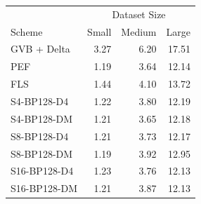 \begin{tabular}{lrrr}
\toprule
 & \multicolumn{3}{c}{Dataset Size} \\
Scheme & Small & Medium & Large \\
\midrule
GVB + Delta & 3.27 & 6.20 & 17.51 \\
PEF & 1.19 & 3.64 & 12.14 \\
FLS & 1.44 & 4.10 & 13.72 \\
S4-BP128-D4 & 1.22 & 3.80 & 12.19 \\
S4-BP128-DM & 1.21 & 3.65 & 12.18 \\
S8-BP128-D4 & 1.21 & 3.73 & 12.17 \\
S8-BP128-DM & 1.19 & 3.92 & 12.95 \\
S16-BP128-D4 & 1.23 & 3.76 & 12.13 \\
S16-BP128-DM & 1.21 & 3.87 & 12.13 \\
\bottomrule
\end{tabular}
